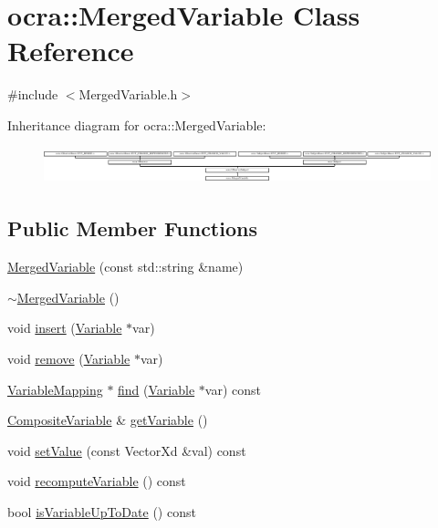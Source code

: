 \hypertarget{classocra_1_1MergedVariable}{}\section{ocra\+:\+:Merged\+Variable Class Reference}
\label{classocra_1_1MergedVariable}


{\ttfamily \#include $<$Merged\+Variable.\+h$>$}

Inheritance diagram for ocra\+:\+:Merged\+Variable\+:\begin{figure}[H]
\begin{center}
\leavevmode
\includegraphics[height=1.082126cm]{dd/d9c/classocra_1_1MergedVariable}
\end{center}
\end{figure}
\subsection*{Public Member Functions}
\begin{DoxyCompactItemize}
\item 
\hyperlink{classocra_1_1MergedVariable_ac6dcd7217ac6a6097ae95f5fe2afc513}{Merged\+Variable} (const std\+::string \&name)
\item 
\hyperlink{classocra_1_1MergedVariable_aa126050631c068dba3e1d12f31dea9ec}{$\sim$\+Merged\+Variable} ()
\item 
void \hyperlink{classocra_1_1MergedVariable_aa91f4ed9514c3dd4bf1ae4e25cf1e118}{insert} (\hyperlink{classocra_1_1Variable}{Variable} $\ast$var)
\item 
void \hyperlink{classocra_1_1MergedVariable_ae0a14af6f9fb0b0dc72d6023e7e40069}{remove} (\hyperlink{classocra_1_1Variable}{Variable} $\ast$var)
\item 
\hyperlink{classocra_1_1VariableMapping}{Variable\+Mapping} $\ast$ \hyperlink{classocra_1_1MergedVariable_a54dea5dde63addca4de73ea8fdb6073b}{find} (\hyperlink{classocra_1_1Variable}{Variable} $\ast$var) const
\item 
\hyperlink{classocra_1_1CompositeVariable}{Composite\+Variable} \& \hyperlink{classocra_1_1MergedVariable_afa4986407c3fbaebe268fd248b2c4bcf}{get\+Variable} ()
\item 
void \hyperlink{classocra_1_1MergedVariable_a2c53faf60a0aa267457aa6688b7341aa}{set\+Value} (const Vector\+Xd \&val) const
\item 
void \hyperlink{classocra_1_1MergedVariable_a5edb99e2c6596addb6b5a1c991f79699}{recompute\+Variable} () const
\item 
bool \hyperlink{classocra_1_1MergedVariable_a1da61e970d1c32c9ad94da57914d5aeb}{is\+Variable\+Up\+To\+Date} () const
\end{DoxyCompactItemize}
